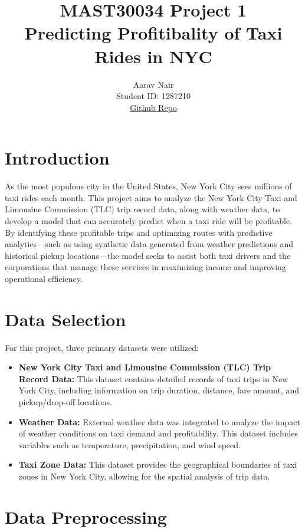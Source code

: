 \documentclass[11pt]{article}
\title{\textbf{MAST30034 Project 1} \\ Predicting Profitibality of Taxi Rides in NYC}
\author{
Aarav Nair \\
Student ID: 1287210 \\
\href{https://github.com/MAST30034-AppliedDataScience/project-1-individual-tumblesbdj}{Github Repo}
}
\begin{document}
\maketitle 

\section{Introduction} 

As the most populous city in the United States, New York City sees millions of taxi rides each month. This project aims to analyze the New York City Taxi and Limousine Commission (TLC) trip record data\cite{tlc_data}, along with weather data, to develop a model that can accurately predict when a taxi ride will be profitable. By identifying these profitable trips and optimizing routes with predictive analytics—such as using synthetic data generated from weather predictions and historical pickup locations—the model seeks to assist both taxi drivers and the corporations that manage these services in maximizing income and improving operational efficiency.

\section{Data Selection}

For this project, three primary datasets were utilized:

\begin{itemize}
    \item \textbf{New York City Taxi and Limousine Commission (TLC) Trip Record Data:} This dataset contains detailed records of taxi trips in New York City, including information on trip duration, distance, fare amount, and pickup/drop-off locations.

    \item \textbf{Weather Data:} External weather data was integrated to analyze the impact of weather conditions on taxi demand and profitability. This dataset includes variables such as temperature, precipitation, and wind speed.

    \item \textbf{Taxi Zone Data:} This dataset provides the geographical boundaries of taxi zones in New York City, allowing for the spatial analysis of trip data. 
\end{itemize}

\section{Data Preprocessing}
\end{document}
